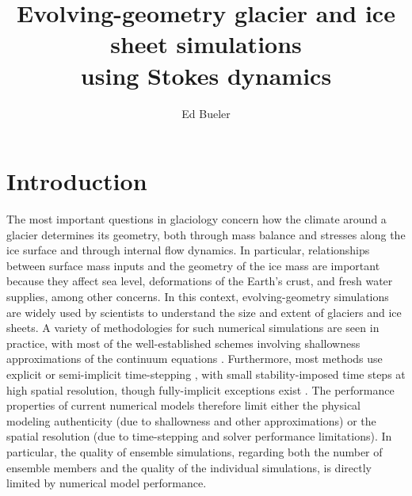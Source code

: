 \documentclass[letterpaper,final,12pt,reqno]{amsart}
\begin{document}
\title[Evolving-geometry glacier and ice sheet simulations using Stokes dynamics]{Evolving-geometry glacier and ice sheet simulations \\ using Stokes dynamics}

\author{Ed Bueler}


\maketitle

\thispagestyle{empty}
\bigskip

\section{Introduction} \label{sec:intro}

The most important questions in glaciology concern how the climate around a glacier determines its geometry, both through mass balance and stresses along the ice surface and through internal flow dynamics.  In particular, relationships between surface mass inputs and the geometry of the ice mass are important because they affect sea level, deformations of the Earth's crust, and fresh water supplies, among other concerns.  In this context, evolving-geometry simulations are widely used by scientists to understand the size and extent of glaciers and ice sheets.  A variety of methodologies for such numerical simulations are seen in practice, with most of the well-established schemes involving shallowness approximations of the continuum equations \cite[for example]{Hoffmanetal2018,Lipscombetal2019,Winkelmannetal2011}.  Furthermore, most methods use explicit or semi-implicit time-stepping \cite{HindmarshPayne1996,Hoffmanetal2018,Lipscombetal2019,Winkelmannetal2011}, with small stability-imposed time steps at high spatial resolution, though fully-implicit exceptions exist \cite{Brinkerhoffetal2017,Bueler2016}.  The performance properties of current numerical models therefore limit either the physical modeling authenticity (due to shallowness and other approximations) or the spatial resolution (due to time-stepping and solver performance limitations).  In particular, the quality of ensemble simulations, regarding both the number of ensemble members and the quality of the individual simulations, is directly limited by numerical model performance.
\end{document}
